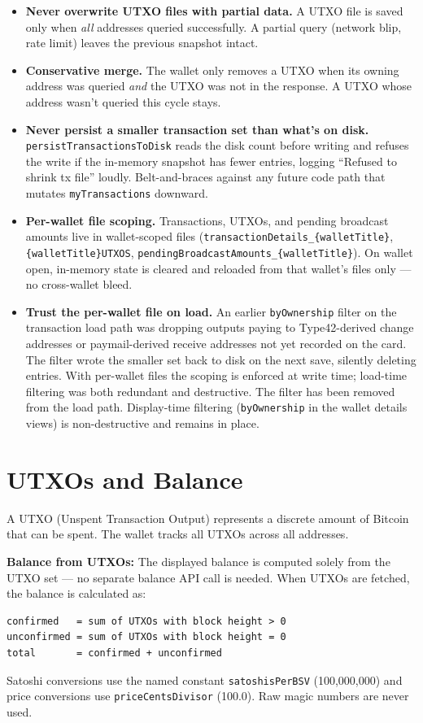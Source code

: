 \documentclass[a4paper, 11pt, openany]{book}
\begin{document}
\begin{itemize}
\item \textbf{Never overwrite UTXO files with partial data.} A UTXO file is saved only when \emph{all} addresses queried successfully. A partial query (network blip, rate limit) leaves the previous snapshot intact.
\item \textbf{Conservative merge.} The wallet only removes a UTXO when its owning address was queried \emph{and} the UTXO was not in the response. A UTXO whose address wasn't queried this cycle stays.
\item \textbf{Never persist a smaller transaction set than what's on disk.} \texttt{persist\-Trans\-actions\-To\-Disk} reads the disk count before writing and refuses the write if the in-memory snapshot has fewer entries, logging ``Refused to shrink tx file'' loudly. Belt-and-braces against any future code path that mutates \texttt{myTransactions} downward.
\item \textbf{Per-wallet file scoping.} Transactions, UTXOs, and pending broadcast amounts live in wallet-scoped files (\texttt{transactionDetails\_\{walletTitle\}}, \texttt{\{walletTitle\}UTXOS}, \texttt{pendingBroadcastAmounts\_\{walletTitle\}}). On wallet open, in-memory state is cleared and reloaded from that wallet's files only --- no cross-wallet bleed.
\item \textbf{Trust the per-wallet file on load.} An earlier \texttt{by\-Owner\-ship} filter on the transaction load path was dropping outputs paying to Type42-derived change addresses or paymail-derived receive addresses not yet recorded on the card. The filter wrote the smaller set back to disk on the next save, silently deleting entries. With per-wallet files the scoping is enforced at write time; load-time filtering was both redundant and destructive. The filter has been removed from the load path. Display-time filtering (\texttt{by\-Owner\-ship} in the wallet details views) is non-destructive and remains in place.
\end{itemize}

\section{UTXOs and Balance}

A UTXO (Unspent Transaction Output) represents a discrete amount of Bitcoin that can be spent. The wallet tracks all UTXOs across all addresses.

\begin{notebox}
\textbf{Balance from UTXOs:} The displayed balance is computed solely from the UTXO set --- no separate balance API call is needed. When UTXOs are fetched, the balance is calculated as:
\begin{lstlisting}
confirmed   = sum of UTXOs with block height > 0
unconfirmed = sum of UTXOs with block height = 0
total       = confirmed + unconfirmed
\end{lstlisting}
Satoshi conversions use the named constant \texttt{satoshisPerBSV} (100,000,000) and price conversions use \texttt{priceCentsDivisor} (100.0). Raw magic numbers are never used.
\end{notebox}
\end{document}
